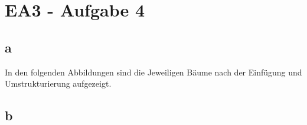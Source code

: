 \documentclass[12pt]{article}
\begin{document}
\newpage

\section*{EA3 - Aufgabe 4}
\subsection*{a}
In den folgenden Abbildungen sind die Jeweiligen Bäume nach der Einfügung und Umstrukturierung
aufgezeigt.

\begin{figure}[h] 
	\centering
    \subfigure[+3]{\scalebox{.5}{}} 
	\hspace{3cm}
    \subfigure[+4]{\scalebox{.5}{}} 
	\hspace{3cm}
	\subfigure[1 eingefügt]{\scalebox{.5}{}}
\end{figure} 


\begin{figure}[h] 
	\centering
    \subfigure[10 eingefügt]{\scalebox{.5}{}} 
	\hspace{1cm}
    \subfigure[19 eingefügt]{\scalebox{.5}{}} 
	\hspace{1cm}
	\subfigure[2 eingefügt]{\scalebox{.5}{}}
\end{figure} 


\begin{figure}[h] 
	\centering
    \subfigure[2 eingefügt]{\scalebox{.5}{}} 
	\hspace{2cm}
    \subfigure[5 eingefügt]{\scalebox{.5}{}} 
\end{figure} 


\begin{figure}[h] 
	\centering
    \subfigure[7 eingefügt]{\scalebox{.5}{}} 
	\hspace{2cm}
    \subfigure[16 eingefügt]{\scalebox{.5}{}} 
\end{figure} 



\newpage


\subsection*{b}
\end{document}
